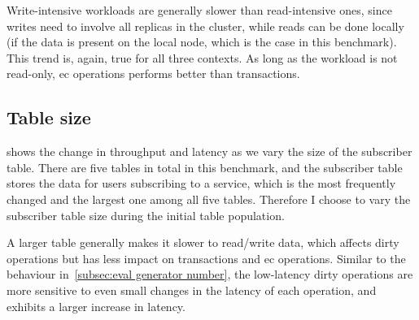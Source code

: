 Write-intensive workloads are generally slower than read-intensive ones, since
writes need to involve all replicas in the cluster, while reads can be done
locally (if the data is present on the local node, which is the case in this
benchmark). This trend is, again, true for all three contexts. As long as the workload
is not read-only, \acrshort{ec} operations performs better than transactions.


\subsection{Table size} \label{subsec:eval table size}

 shows the change in throughput and latency as we vary
the size of the subscriber table. There are five tables in total in this benchmark, 
and the subscriber table stores the data for users
subscribing to a service, which is the most frequently changed and the largest one 
among all five tables. Therefore I choose to vary the 
subscriber table size during the initial table population.

A larger table generally makes it slower to read/write data, which affects
dirty operations but has less impact on transactions and
\acrshort{ec} operations. Similar to the behaviour in~\cref{subsec:eval generator number}, 
the low-latency dirty operations are more sensitive to even small changes in
the latency of each operation, and exhibits a larger increase in latency.


